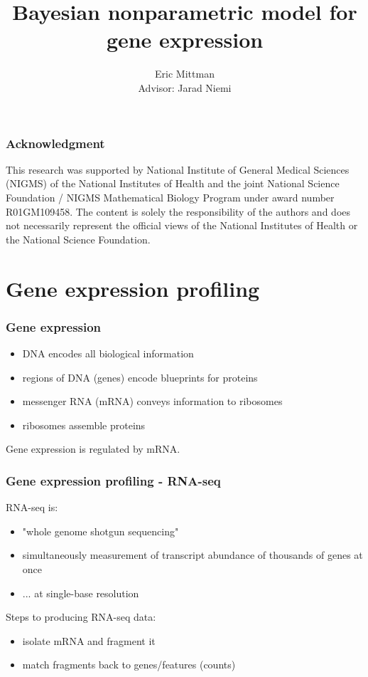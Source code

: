 \documentclass{beamer}
\title{Bayesian nonparametric model for gene expression}
\author{Eric Mittman \\ \vspace{.5cm} Advisor: Jarad Niemi}
\begin{document}
\frame{\titlepage}


\begin{frame}[label=current]
\frametitle{Acknowledgment}
This research was supported by National Institute of General Medical Sciences (NIGMS) of the National Institutes of Health and the joint National Science Foundation / NIGMS Mathematical Biology Program under award number R01GM109458. The content is solely the responsibility of the authors and does not necessarily represent the official views of the National Institutes of Health or the National Science Foundation.
\end{frame}

\section[Gene Expr.]{Gene expression profiling}

\begin{frame}[label=current]
\frametitle{Gene expression}
{\scriptsize \citep[\textit{Statistical Analysis of Next Generation Sequencing Data}]{datta2014}}
\begin{itemize}
\pause\item DNA encodes all biological information
\pause\item regions of DNA (genes) encode blueprints for proteins
\pause\item messenger RNA (mRNA) conveys information to ribosomes
\pause\item ribosomes assemble proteins
\end{itemize}
\pause Gene expression is regulated by mRNA.
\end{frame}

\begin{frame}[label=current]
\frametitle{Gene expression profiling - RNA-seq}
\pause RNA-seq is:
\vspace{.5cm}
\begin{itemize}
\pause \item "whole genome shotgun sequencing"
\pause \item simultaneously measurement of transcript abundance of thousands of genes at once
\pause \item ... at single-base resolution
\end{itemize}

\vspace{.5cm}
Steps to producing RNA-seq data:
\vspace{.5cm}
\begin{itemize}
\pause \item isolate mRNA and fragment it
\pause \item match fragments back to genes/features (counts)
\end{itemize}
\end{frame}
\end{document}
